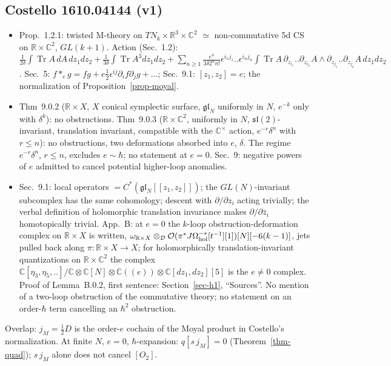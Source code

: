 \documentclass[10pt,a4paper]{article}
\numberwithin{equation}{section}
\theoremstyle{definition}
\theoremstyle{remark}
\newcommand{\Tr}{\operatorname{Tr}}
\newcommand{\fsl}{\mathfrak{sl}}
\newcommand{\fgl}{\mathfrak{gl}}
\newcommand{\zb}{\bar z}
\begin{document}
\subsection{Costello 1610.04144 (v1)}
\begin{itemize}\itemsep1pt
\item Prop.~1.2.1: twisted M-theory on $TN_k\times\mathbb R^3\times\mathbb C^2$ $\simeq$ non-commutative 5d CS on $\mathbb R\times\mathbb C^2$, $GL(k+1)$. Action (Sec.~1.2): $\frac1{2\delta}\int\Tr A\,dA\,dz_1dz_2+\frac1{3\delta}\int\Tr A^3dz_1dz_2+\sum_{n\ge1}\frac{e^n}{3\delta2^nn!}\epsilon^{i_1j_1}..\epsilon^{i_nj_n}\int\Tr A\,\partial_{z_{i_1}}..\partial_{z_{i_n}}A\wedge\partial_{z_{j_1}}..\partial_{z_{j_n}}A\,dz_1dz_2$. Sec.~5: $f*_eg=fg+e\frac12\epsilon^{ij}\partial_if\partial_jg+\dots$; Sec.~9.1: $[z_1,z_2]=e$; the normalization of Proposition~\ref{prop-moyal}.
\item Thm~9.0.2 ($\mathbb R\times X$, $X$ conical symplectic surface, $\fgl_N$ uniformly in $N$, $e^{-k}$ only with $\delta^k$): no obstructions. Thm~9.0.3 ($\mathbb R\times\mathbb C^2$, uniformly in $N$, $\fsl(2)$-invariant, translation invariant, compatible with the $\mathbb C^\times$ action, $e^{-r}\delta^n$ with $r\le n$): no obstructions, two deformations absorbed into $e$, $\delta$. The regime $e^{-r}\delta^n$, $r\le n$, excludes $e\sim\hbar$; no statement at $e=0$. Sec.~9: negative powers of $e$ admitted to cancel potential higher-loop anomalies.
\item Sec.~9.1: local operators $=C^*(\fgl_N[[z_1,z_2]])$; the $GL(N)$-invariant subcomplex has the same cohomology; descent with $\partial/\partial z_i$ acting trivially; the verbal definition of holomorphic translation invariance makes $\partial/\partial\zb_i$ homotopically trivial. App.~B: at $e=0$ the $k$-loop obstruction-deformation complex on $\mathbb R\times X$ is written, $\omega_{\mathbb R\times X}\otimes_{\mathcal D}\mathcal O(\pi^*J\Omega^{-*}_{\rm hol}[t^{-1}][1])[N][-6(k-1)]$, jets pulled back along $\pi:\mathbb R\times X\to X$; for holomorphically translation-invariant quantizations on $\mathbb R\times\mathbb C^2$ the complex $\mathbb C[\eta_3,\eta_5,..]/\mathbb C\otimes\mathbb C[N]\otimes\mathbb C((e))\otimes\mathbb C[dz_1,dz_2][5]$ is the $e\ne0$ complex. Proof of Lemma~B.0.2, first sentence: Section~\ref{sec-h1}, ``Sources''. No mention of a two-loop obstruction of the commutative theory; no statement on an order-$\hbar$ term cancelling an $\hbar^2$ obstruction.
\end{itemize}
Overlap: $j_M=\frac12D$ is the order-$e$ cochain of the Moyal product in Costello's normalization. At finite $N$, $e=0$, $\hbar$-expansion: $q[s\,j_M]=0$ (Theorem~\ref{thm-quad}); $s\,j_M$ alone does not cancel $[O_2]$.
\end{document}

